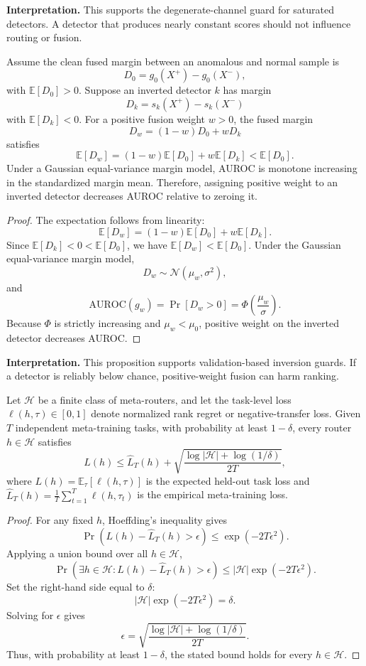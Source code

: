 \medskip
\noindent\textbf{Interpretation.}
This supports the degenerate-channel guard for saturated detectors. A detector that produces nearly constant scores should not influence routing or fusion.

\begin{proposition}
\label{prop:inverted_harm}
Assume the clean fused margin between an anomalous and normal sample is
\[
D_0=g_0(X^+)-g_0(X^-),
\]
with $\mathbb{E}[D_0]>0$. Suppose an inverted detector $k$ has margin
\[
D_k=s_k(X^+)-s_k(X^-)
\]
with $\mathbb{E}[D_k]<0$. For a positive fusion weight $w>0$, the fused margin
\[
D_w=(1-w)D_0+wD_k
\]
satisfies
\[
\mathbb{E}[D_w]
=
(1-w)\mathbb{E}[D_0]+w\mathbb{E}[D_k]
<
\mathbb{E}[D_0].
\]
Under a Gaussian equal-variance margin model, AUROC is monotone increasing in the standardized margin mean. Therefore, assigning positive weight to an inverted detector decreases AUROC relative to zeroing it.
\end{proposition}
\begin{proof}
The expectation follows from linearity:
\[
\mathbb{E}[D_w]
=
(1-w)\mathbb{E}[D_0]+w\mathbb{E}[D_k].
\]
Since $\mathbb{E}[D_k]<0<\mathbb{E}[D_0]$, we have $\mathbb{E}[D_w]<\mathbb{E}[D_0]$.
Under the Gaussian equal-variance margin model,
\[
D_w\sim \mathcal{N}(\mu_w,\sigma^2),
\]
and
\[
\mathrm{AUROC}(g_w)=\Pr[D_w>0]=\Phi\left(\frac{\mu_w}{\sigma}\right).
\]
Because $\Phi$ is strictly increasing and $\mu_w<\mu_0$, positive weight on the inverted detector decreases AUROC.
\end{proof}

\medskip
\noindent\textbf{Interpretation.}
This proposition supports validation-based inversion guards. If a detector is reliably below chance, positive-weight fusion can harm ranking.

\begin{proposition}
\label{prop:generalization_tasks}
Let $\mathcal{H}$ be a finite class of meta-routers, and let the task-level loss $\ell(h,\tau)\in[0,1]$ denote normalized rank regret or negative-transfer loss. Given $T$ independent meta-training tasks, with probability at least $1-\delta$, every router $h\in\mathcal{H}$ satisfies
\[
L(h)
\leq
\widehat{L}_T(h)
+
\sqrt{\frac{\log|\mathcal{H}|+\log(1/\delta)}{2T}},
\]
where $L(h)=\mathbb{E}_\tau[\ell(h,\tau)]$ is the expected held-out task loss and $\widehat{L}_T(h)=\frac{1}{T}\sum_{t=1}^T\ell(h,\tau_t)$ is the empirical meta-training loss.
\end{proposition}
\begin{proof}
For any fixed $h$, Hoeffding's inequality gives
\[
\Pr\left(
L(h)-\widehat{L}_T(h)>\epsilon
\right)
\leq
\exp(-2T\epsilon^2).
\]
Applying a union bound over all $h\in\mathcal{H}$,
\[
\Pr\left(
\exists h\in\mathcal{H}: L(h)-\widehat{L}_T(h)>\epsilon
\right)
\leq
|\mathcal{H}|\exp(-2T\epsilon^2).
\]
Set the right-hand side equal to $\delta$:
\[
|\mathcal{H}|\exp(-2T\epsilon^2)=\delta.
\]
Solving for $\epsilon$ gives
\[
\epsilon=
\sqrt{\frac{\log|\mathcal{H}|+\log(1/\delta)}{2T}}.
\]
Thus, with probability at least $1-\delta$, the stated bound holds for every $h\in\mathcal{H}$.
\end{proof}

